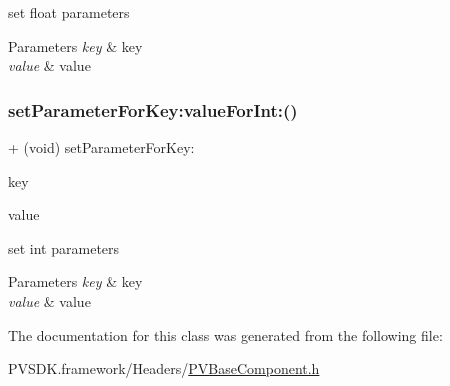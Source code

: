 set float parameters


\begin{DoxyParams}{Parameters}
{\em key} & key \\
\hline
{\em value} & value \\
\hline
\end{DoxyParams}
\mbox{\label{interface_p_v_base_component_a8823275eace0c9358aaf7c0ba7d8cffe}} 
\subsubsection{\texorpdfstring{set\+Parameter\+For\+Key\+:value\+For\+Int\+:()}{setParameterForKey:valueForInt:()}}
{\footnotesize\ttfamily + (void) set\+Parameter\+For\+Key\+: \begin{DoxyParamCaption}\item[{(N\+S\+String $\ast$\+\_\+\+Nonnull)}]{key }\item[{valueForInt:(int)}]{value }\end{DoxyParamCaption}}

set int parameters


\begin{DoxyParams}{Parameters}
{\em key} & key \\
\hline
{\em value} & value \\
\hline
\end{DoxyParams}


The documentation for this class was generated from the following file\+:\begin{DoxyCompactItemize}
\item 
P\+V\+S\+D\+K.\+framework/\+Headers/\hyperlink{_p_v_base_component_8h}{P\+V\+Base\+Component.\+h}\end{DoxyCompactItemize}
